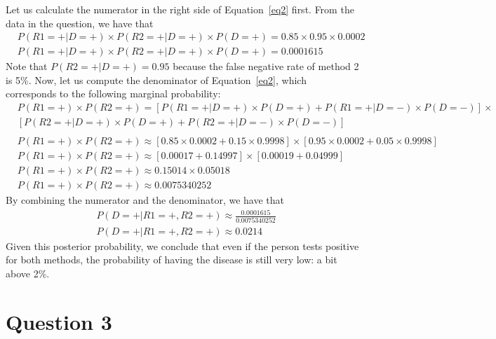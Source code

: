 \documentclass[leqno]{article}
\begin{document}
\noindent Let us calculate the numerator in the right side of Equation~\ref{eq2} first. From
the data in the question, we have that
\begin{equation*}
\begin{split}
&P(R1 = +|D = +) \times P(R2 = +| D = +) \times P(D = +) = 0.85 \times 0.95 \times 0.0002
\\
&P(R1 = +|D = +) \times P(R2 = +| D = +) \times P(D = +) = 0.0001615
\end{split}  
\end{equation*}  
Note that $P(R2 = +| D = +) = 0.95$ because the false negative rate of method 2 is 5\%. Now, let us
compute the denominator of Equation~\ref{eq2}, which corresponds to the following marginal
probability:
\begin{equation*}
\begin{split}
&P(R1 = +) \times P(R2 = +) = [P(R1 = +|D = +) \times P(D = +) + P(R1 = +|D = -) \times P(D = -)] \times
\\
&[P(R2 = +|D = +) \times P(D = +) + P(R2 = +|D = -) \times P(D = -)]
\\
\\
&P(R1 = +) \times P(R2 = +) \approx [0.85 \times 0.0002 + 0.15 \times 0.9998] \times [0.95 \times 0.0002 + 0.05 \times 0.9998]
\\
&P(R1 = +) \times P(R2 = +) \approx [0.00017 + 0.14997] \times [0.00019 + 0.04999]
\\
&P(R1 = +) \times P(R2 = +) \approx 0.15014 \times 0.05018
\\
&P(R1 = +) \times P(R2 = +) \approx 0.0075340252
\end{split}  
\end{equation*}
By combining the numerator and the denominator, we have that
\begin{equation*}
\begin{split}
&P(D = +| R1 = +, R2 = +) \approx \frac{0.0001615}{0.0075340252}
\\
&P(D = +| R1 = +, R2 = +) \approx 0.0214
\end{split}  
\end{equation*}
Given this posterior probability, we conclude that even if the person tests positive for both methods, the probability of having the
disease is still very low: a bit above 2\%. %


\section*{Question 3}
\end{document}
